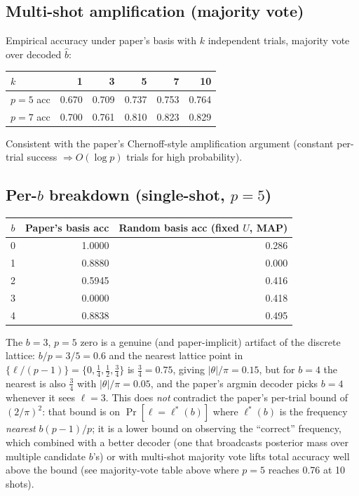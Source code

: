 \documentclass[11pt]{article}
\begin{document}
\subsection{Multi-shot amplification (majority vote)}
Empirical accuracy under paper's basis with $k$ independent trials, majority
vote over decoded $\hat b$:
\begin{center}
\small
\begin{tabular}{@{}l r r r r r@{}}
\toprule
$k$ & 1 & 3 & 5 & 7 & 10 \\
\midrule
$p=5$ acc & 0.670 & 0.709 & 0.737 & 0.753 & 0.764 \\
$p=7$ acc & 0.700 & 0.761 & 0.810 & 0.823 & 0.829 \\
\bottomrule
\end{tabular}
\end{center}
Consistent with the paper's Chernoff-style amplification argument (constant
per-trial success $\Rightarrow O(\log p)$ trials for high probability).

\subsection{Per-$b$ breakdown (single-shot, $p=5$)}
\begin{center}
\small
\begin{tabular}{@{}c r r@{}}
\toprule
$b$ & Paper's basis acc & Random basis acc (fixed $U$, MAP) \\
\midrule
0 & 1.0000 & 0.286 \\
1 & 0.8880 & 0.000 \\
2 & 0.5945 & 0.416 \\
3 & 0.0000 & 0.418 \\
4 & 0.8838 & 0.495 \\
\bottomrule
\end{tabular}
\end{center}

The $b=3$, $p=5$ zero is a genuine (and paper-implicit) artifact of the
discrete lattice: $b/p=3/5=0.6$ and the nearest lattice point in
$\{\ell/(p-1)\}=\{0,\tfrac14,\tfrac12,\tfrac34\}$ is $\tfrac34=0.75$, giving
$|\theta|/\pi = 0.15$, but for $b=4$ the nearest is also $\tfrac34$ with
$|\theta|/\pi=0.05$, and the paper's argmin decoder picks $b=4$ whenever it
sees $\ell=3$. This does \emph{not} contradict the paper's per-trial bound of
$(2/\pi)^{2}$: that bound is on $\Pr[\ell = \ell^{*}(b)]$ where $\ell^{*}(b)$
is the frequency \emph{nearest} $b(p-1)/p$; it is a lower bound on
observing the ``correct'' frequency, which combined with a better decoder
(one that broadcasts posterior mass over multiple candidate $b$'s) or with
multi-shot majority vote lifts total accuracy well above the bound (see
majority-vote table above where $p=5$ reaches 0.76 at 10 shots).
\end{document}
